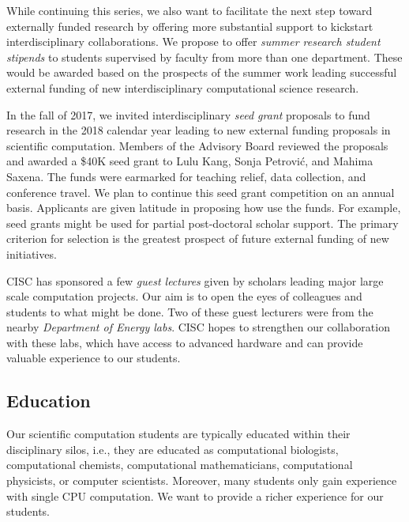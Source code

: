 \documentclass[12pt]{amsart}
\begin{document}
While continuing this series, we also want to facilitate the next step toward externally funded research by offering more substantial support to kickstart interdisciplinary collaborations.  We propose to offer \emph{summer research student stipends} to students supervised by faculty from more than one department.  These would be awarded based on the prospects of the summer work leading successful external funding of new interdisciplinary computational science research. 

In the fall of 2017, we invited interdisciplinary \emph{seed grant} proposals to fund research in the 2018 calendar year leading to new external funding proposals in scientific computation.  Members of the Advisory Board reviewed the proposals and awarded a \$40K seed grant to Lulu Kang, Sonja Petrovi\'c, and Mahima Saxena. The funds were earmarked for teaching relief, data collection, and conference travel.  We plan to continue this seed grant competition on an annual basis.  Applicants are given latitude in proposing how use the funds.  For example, seed grants might be used for partial post-doctoral scholar support.  The primary criterion for selection is the greatest prospect of future external funding of new initiatives.

CISC has sponsored a few \emph{guest lectures} given by scholars leading major large scale computation projects.  Our aim is to open the eyes of colleagues and students to what might be done.  Two of these guest lecturers were from the nearby \emph{Department of Energy labs}.  CISC hopes to strengthen our collaboration with these labs, which have access to advanced hardware and can provide valuable experience to our students. 

\subsection*{Education}Our scientific computation students are typically educated within their disciplinary silos, i.e., they are educated as computational biologists, computational chemists, computational mathematicians, computational physicists, or computer scientists.  Moreover, many students only gain experience with single CPU computation. We want to provide a richer experience for our students.
\end{document}
